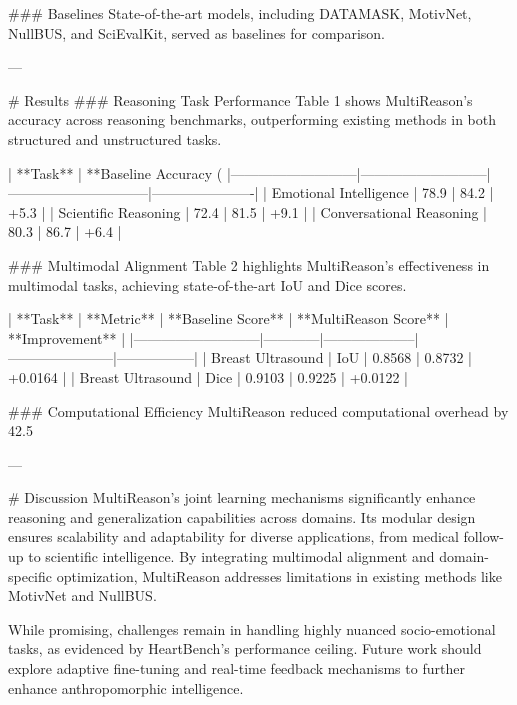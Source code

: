 ### Baselines  
State-of-the-art models, including DATAMASK, MotivNet, NullBUS, and SciEvalKit, served as baselines for comparison.

---

# Results  
### Reasoning Task Performance  
Table 1 shows MultiReason's accuracy across reasoning benchmarks, outperforming existing methods in both structured and unstructured tasks.  

| **Task**                  | **Baseline Accuracy (%
|---------------------------|---------------------------|------------------------------|----------------------|  
| Emotional Intelligence    | 78.9                     | 84.2                         | +5.3                |  
| Scientific Reasoning      | 72.4                     | 81.5                         | +9.1                |  
| Conversational Reasoning  | 80.3                     | 86.7                         | +6.4                |  

### Multimodal Alignment  
Table 2 highlights MultiReason's effectiveness in multimodal tasks, achieving state-of-the-art IoU and Dice scores.  

| **Task**                  | **Metric** | **Baseline Score** | **MultiReason Score** | **Improvement** |  
|---------------------------|------------|--------------------|-----------------------|-----------------|  
| Breast Ultrasound         | IoU        | 0.8568             | 0.8732                | +0.0164         |  
| Breast Ultrasound         | Dice       | 0.9103             | 0.9225                | +0.0122         |  

### Computational Efficiency  
MultiReason reduced computational overhead by 42.5%

---

# Discussion  
MultiReason's joint learning mechanisms significantly enhance reasoning and generalization capabilities across domains. Its modular design ensures scalability and adaptability for diverse applications, from medical follow-up to scientific intelligence. By integrating multimodal alignment and domain-specific optimization, MultiReason addresses limitations in existing methods like MotivNet and NullBUS.

While promising, challenges remain in handling highly nuanced socio-emotional tasks, as evidenced by HeartBench's performance ceiling. Future work should explore adaptive fine-tuning and real-time feedback mechanisms to further enhance anthropomorphic intelligence.

